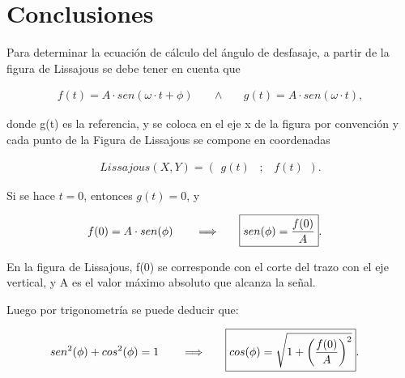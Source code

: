   \section{Conclusiones}

    Para determinar la ecuación de cálculo del ángulo de desfasaje, a partir 
    de la figura de Lissajous se debe tener en cuenta que

    \begin{align*}
      f(t)=A \cdot sen(\omega \cdot t + \phi) \hspace{20pt} \land \hspace{20pt} g(t)=A \cdot sen(\omega \cdot t),
    \end{align*}

    donde g(t) es la referencia, y se coloca en el eje x de la figura por convención y
    cada punto de la Figura de Lissajous se compone en coordenadas

    \begin{align*}
     Lissajous(X,Y)= ( \hspace{5pt} g(t) \hspace{10pt} ; \hspace{10pt} f(t) \hspace{5pt}).
    \end{align*}
    
    Si se hace $t=0$, entonces $g(t)=0$, y 

    \begin{align*}
      f(0)=A \cdot sen(\phi) \hspace{20pt} \Longrightarrow \hspace{20pt} \Aboxed{sen(\phi)=\frac{f(0)}{A}}.
    \end{align*}

    En la figura de Lissajous, f(0) se corresponde con el corte del trazo con el eje vertical, y A es el valor 
    máximo absoluto que alcanza la señal.

    Luego por trigonometría se puede deducir que:

    \begin{align*}
      sen^2(\phi)+cos^2(\phi)=1 \hspace{20pt} \Longrightarrow \hspace{20pt} \Aboxed{cos(\phi)= \sqrt{1 +  \left( \dfrac{f(0)}{A} \right)^2} }.
    \end{align*}

